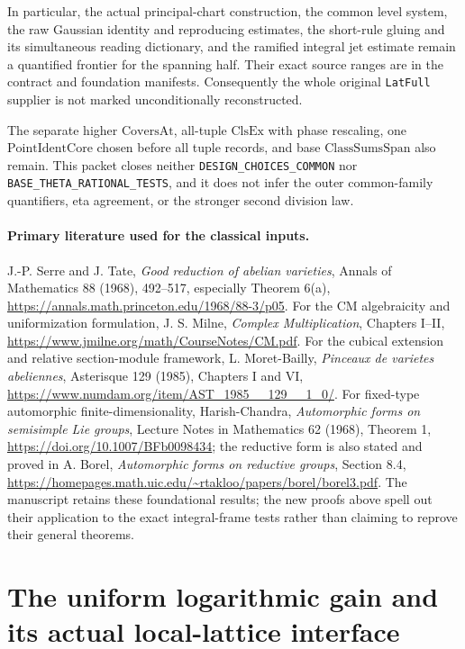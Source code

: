 \documentclass[11pt,a4paper]{article}
\numberwithin{equation}{section}
\theoremstyle{remark}\newtheorem{remark}[theorem]{Remark}
\begin{document}
In particular, the actual principal-chart construction,
the common level system, the raw Gaussian identity and
reproducing estimates, the short-rule gluing and its
simultaneous reading dictionary, and the ramified
integral jet estimate remain a quantified frontier
for the spanning half.  Their exact source ranges
are in the contract and foundation manifests.
Consequently the whole original \texttt{Lat\allowbreak Full}
supplier is not marked unconditionally reconstructed.

The separate higher \(\mathrm{CoversAt}\), all-tuple
\(\mathrm{ClsEx}\) with phase rescaling, one
\(\mathrm{PointIdentCore}\) chosen before all tuple
records, and base \(\mathrm{ClassSumsSpan}\) also
remain.  This packet closes neither
\texttt{DESIGN\_\allowbreak CHOICES\_\allowbreak COMMON} nor
\texttt{BASE\_\allowbreak THETA\_\allowbreak RATIONAL\_\allowbreak TESTS}, and it
does not infer the outer common-family quantifiers,
eta agreement, or the stronger second division law.

\paragraph{Primary literature used for the classical inputs.}
J.-P. Serre and J. Tate, \emph{Good reduction of abelian
varieties}, Annals of Mathematics 88 (1968), 492--517,
especially Theorem 6(a),
\url{https://annals.math.princeton.edu/1968/88-3/p05}.
For the CM algebraicity and uniformization formulation,
J. S. Milne, \emph{Complex Multiplication}, Chapters I--II,
\url{https://www.jmilne.org/math/CourseNotes/CM.pdf}.
For the cubical extension and relative section-module
framework, L. Moret-Bailly, \emph{Pinceaux de varietes
abeliennes}, Asterisque 129 (1985), Chapters I and VI,
\url{https://www.numdam.org/item/AST_1985__129__1_0/}.
For fixed-type automorphic finite-dimensionality,
Harish-Chandra, \emph{Automorphic forms on semisimple
Lie groups}, Lecture Notes in Mathematics 62 (1968),
Theorem 1,
\url{https://doi.org/10.1007/BFb0098434}; the reductive
form is also stated and proved in A. Borel,
\emph{Automorphic forms on reductive groups}, Section 8.4,
\url{https://homepages.math.uic.edu/~rtakloo/papers/borel/borel3.pdf}.
The manuscript retains these foundational results;
the new proofs above spell out their application to
the exact integral-frame tests rather than claiming
to reprove their general theorems.


\section{The uniform logarithmic gain and its actual local-lattice interface}
\label{sec:global-local-gain-v046}
\end{document}
